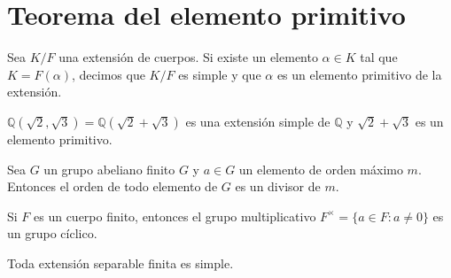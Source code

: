 \chapter{Teorema del elemento primitivo}

\begin{definition}
    Sea $K/F$ una extensión de cuerpos. Si existe un elemento $\alpha \in K$ tal que $K = F(\alpha)$, decimos que $K/F$ es simple y que $\alpha$ es un elemento primitivo de la extensión.
\end{definition}

\begin{example}
    $\mathbb{Q}(\sqrt{2}, \sqrt{3}) = \mathbb{Q}(\sqrt{2} + \sqrt{3})$ es una extensión simple de $\mathbb{Q}$ y $\sqrt{2} + \sqrt{3}$ es un elemento primitivo.
\end{example}

\begin{lemma}
    Sea $G$ un grupo abeliano finito $G$ y $a \in G$ un elemento de orden máximo $m$. Entonces el orden de todo elemento de $G$ es un divisor de $m$.
\end{lemma}

\begin{lemma}
    Si $F$ es un cuerpo finito, entonces el grupo multiplicativo $F^\times = \{ a \in F : a \neq 0 \}$ es un grupo cíclico.
\end{lemma}

\begin{theorem}
    Toda extensión separable finita es simple.
\end{theorem}

